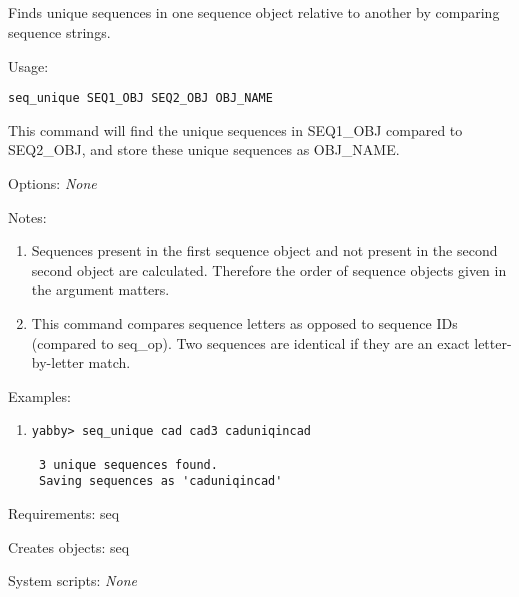 

\subsection[seq\_unique]{  }



Finds unique sequences in one sequence object relative to another
by comparing sequence strings.


\begin{description}


\item{Usage:}

{\tt seq\_unique SEQ1\_OBJ SEQ2\_OBJ OBJ\_NAME}

This command will find the unique sequences in SEQ1\_OBJ compared
to SEQ2\_OBJ, and store these unique sequences as OBJ\_NAME.


\item{Options:} {\em None}


\item{Notes:}
\begin{enumerate}
\item Sequences present in the first sequence object and not present
 in the second second object are calculated. Therefore the order
 of sequence objects given in the argument matters.
\item This command compares sequence letters as opposed to sequence
 IDs (compared to seq\_op). Two sequences are identical if they
 are an exact letter-by-letter match.
\end{enumerate}


\item{Examples:}
\begin{enumerate}

\item
\begin{verbatim}
yabby> seq_unique cad cad3 caduniqincad

 3 unique sequences found.
 Saving sequences as 'caduniqincad'

\end{verbatim}

\end{enumerate}


\item{Requirements:} seq


\item{Creates objects:} seq


\item{System scripts:} {\em None}

\end{description}

